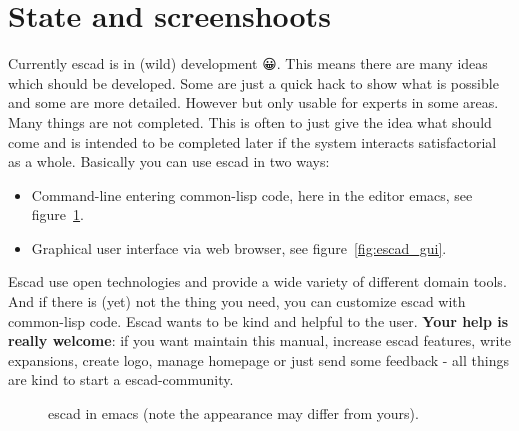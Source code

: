\documentclass[a4paper, 12pt, openany]{scrbook}
\begin{document}
\section{State and screenshoots}
Currently escad is in (wild) development { 😀}. This means there are many ideas which should be developed. Some are just a quick hack to show what is possible and some are more detailed. However but only usable for experts in some areas. Many things are not completed. This is often to just give the idea what should come and is intended to be completed later if the system interacts satisfactorial as a whole.
Basically you can use escad in two ways:
\begin{itemize}
\item Command-line entering common-lisp code, here in the editor emacs, see figure~\ref{fig:escad_emacs}.
\item Graphical user interface via web browser, see figure~\ref{fig:escad_gui}.
\end{itemize}
Escad use open technologies and provide a wide variety of different domain tools. And if there is (yet) not the thing you need, you can customize escad with common-lisp code. Escad wants to be kind and helpful to the user. \textbf{Your help is really welcome}: if you want maintain this manual, increase escad features, write expansions, create logo, manage homepage or just send some feedback - all things are kind to start a escad-community.
\begin{figure}[htbp]
  \centering
  \caption{escad in emacs (note the appearance may differ from yours).}
  \label{fig:escad_emacs}
\end{figure}
\end{document}
